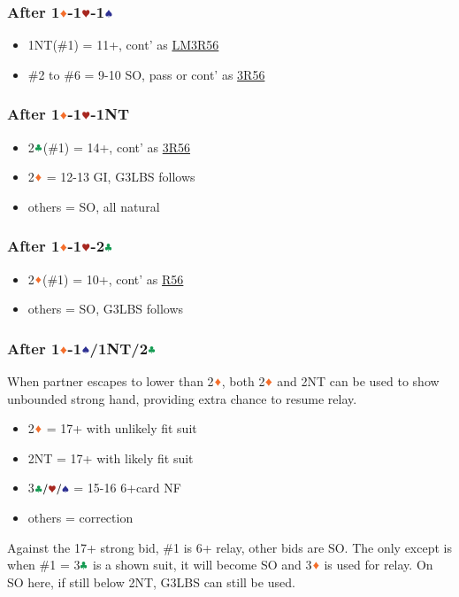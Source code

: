 \documentclass{article}
\begin{document}
\begin{multicols}{2}
\subsubsection{After 1$\ddd$-1$\hhh$-1$\sss$}
\begin{itemize}
    \item 1NT(\#1) = 11+, cont' as \hyperref[sec:nlm3r56]{LM3R56}
    \item \#2 to \#6 = 9-10 SO, pass or cont' as \hyperref[sec:nlm3r56]{3R56}
\end{itemize}

\subsubsection{After 1$\ddd$-1$\hhh$-1NT}
\begin{itemize}
    \item 2$\ccc$(\#1) = 14+, cont' as \hyperref[sec:nlm3r56]{3R56}
    \item 2$\ddd$ = 12-13 GI, G3LBS follows
    \item others = SO, all natural
\end{itemize}

\subsubsection{After 1$\ddd$-1$\hhh$-2$\ccc$}
\begin{itemize}
    \item 2$\ddd$(\#1) = 10+, cont' as \hyperref[sec:nlm3r56]{R56}
    \item others = SO, G3LBS follows
\end{itemize}

\subsubsection{After 1$\ddd$-1$\sss$/1NT/2$\ccc$}\label{sec:1d-escape}
When partner escapes to lower than 2$\ddd$, both 2$\ddd$ and 2NT can be used to show unbounded strong hand, providing extra chance to resume relay.
\begin{itemize}
    \item 2$\ddd$ = 17+ with unlikely fit suit
    \item 2NT = 17+ with likely fit suit
    \item 3$\ccc/\hhh/\sss$ = 15-16 6+card NF
    \item others = correction
\end{itemize}

\noindent Against the 17+ strong bid, \#1 is 6+ relay, other bids are SO. The only except is when \#1 = 3$\ccc$ is a shown suit, it will become SO and 3$\ddd$ is used for relay. On SO here, if still below 2NT, G3LBS can still be used.


\end{multicols}
\end{document}
